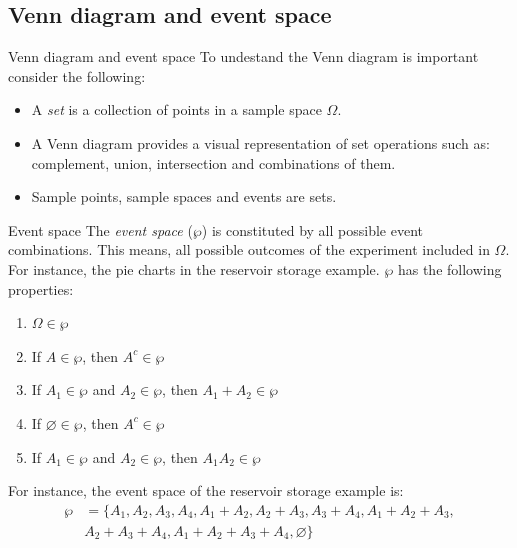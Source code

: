 \documentclass[8pt]{beamer}
\begin{document}
\subsection{Venn diagram and event space}
\begin{frame}{Venn diagram and event space}
    To undestand the Venn diagram is important consider the following:
    \begin{itemize}
        \item A \emph{set} is a collection of points in a sample space $\Omega$.
        \item A Venn diagram provides a visual representation of set operations such as: complement, union, intersection and combinations of them. 
        \item Sample points, sample spaces and events are sets.
    \end{itemize}
    \begin{block}{Event space}
         The \emph{event space} ($\wp$) is constituted by all possible event combinations. This means, all possible outcomes of the experiment included in $\Omega$. For instance, the pie charts in the reservoir storage example. $\wp$ has the following properties:
         \begin{enumerate}
             \item $\Omega \in \wp$ 
             \item If $A \in \wp$, then $A^c \in \wp$ 
             \item If $A_1 \in \wp$ and $A_2 \in \wp$, then $A_1 + A_2 \in \wp$
             \item If $\varnothing \in \wp$, then $A^c \in \wp$
             \item If $A_1 \in \wp$ and $A_2 \in \wp$, then $A_1 A_2 \in \wp$
         \end{enumerate}
         For instance, the event space of the reservoir storage example is:
         $$
         \begin{aligned}
             \wp &= \{ A_1, A_2, A_3, A_4, A_1 + A_2, A_2 + A_3, A_3 + A_4, A_1 + A_2 + A_3, \\
                 & A_2 + A_3 + A_4, A_1 + A_2 + A_3 + A_4, \varnothing \}
         \end{aligned}
         $$
    \end{block}
\end{frame}
\end{document}
